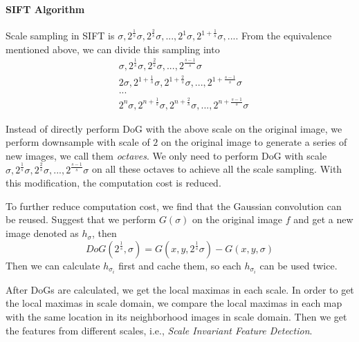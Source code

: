 \documentclass[runningheads]{llncs}
\begin{document}
\paragraph{SIFT Algorithm}
Scale sampling in SIFT is $\sigma, 2^{\frac{1}{s}}\sigma, 2^{\frac{2}{s}}\sigma,..., 2^1\sigma, 2^{1+\frac{1}{s}}\sigma,...$.
From the equivalence mentioned above, we can divide this sampling into
\begin{align*}
    &\sigma, 2^{\frac{1}{s}}\sigma, 2^{\frac{2}{s}}\sigma,...,2^{\frac{s-1}{s}}\sigma \\
    &2\sigma, 2^{1+\frac{1}{s}}\sigma, 2^{1+\frac{2}{s}}\sigma,...,2^{1+\frac{s-1}{s}}\sigma \\
    &...\\
    &2^n\sigma, 2^{n+\frac{1}{s}}\sigma, 2^{n+\frac{2}{s}}\sigma,..., 2^{n+\frac{s-1}{s}}\sigma
\end{align*}
\par
Instead of directly perform DoG with the above scale on the original image,
we perform downsample with scale of $2$ on the original image to generate
a series of new images, we call them \emph{octaves}.
We only need to perform DoG with scale $\sigma, 2^{\frac{1}{s}}\sigma, 2^{\frac{2}{s}}\sigma,...,2^{\frac{s-1}{s}}\sigma$
on all these octaves to achieve all the scale sampling.
With this modification, the computation cost is reduced.
\par
To further reduce computation cost,
we find that the Gaussian convolution can be reused.
Suggest that we perform $G(\sigma)$ on the original image $f$
and get a new image denoted as $h_{\sigma}$,
then 
$$DoG(2^{\frac{1}{s}}, \sigma) = G(x, y, 2^{\frac{1}{s}}\sigma) - G(x, y, \sigma)$$
Then we can calculate $h_{\sigma_i}$ first and cache them,
so each $h_{\sigma_i}$ can be used twice.
\par
After DoGs are calculated, we get the local maximas in each scale.
In order to get the local maximas in scale domain,
we compare the local maximas in each map with the same location in
its neighborhood images in scale domain.
Then we get the features from different scales, i.e., \emph{Scale Invariant Feature Detection}.
\end{document}
